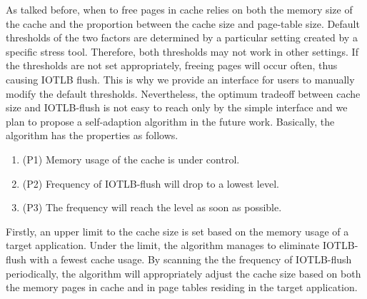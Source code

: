 As talked before, when to free pages in cache relies on both the memory size of the cache and the proportion between the cache size and page-table size. Default thresholds of the two factors are determined by a particular setting created by a specific stress tool. Therefore, both thresholds may not work in other settings. If the thresholds are not set appropriately, freeing pages will occur often, thus causing IOTLB flush. This is why we provide an interface for users to manually modify the default thresholds. Nevertheless, the optimum tradeoff between cache size and IOTLB-flush is not easy to reach only by the simple interface and we plan to propose a self-adaption algorithm in the future work. Basically, the algorithm has the properties as follows.
\begin{enumerate}
\item (P1) Memory usage of the cache is under control.
\item (P2) Frequency of IOTLB-flush will drop to a lowest level.
\item (P3) The frequency will reach the level as soon as possible.
\end{enumerate}

Firstly, an upper limit to the cache size is set based on the memory usage of a target application. Under the limit, the algorithm manages to eliminate IOTLB-flush with a fewest cache usage. By scanning the the frequency of IOTLB-flush periodically, the algorithm will appropriately adjust the cache size based on both the memory pages in cache and in page tables residing in the target application.




